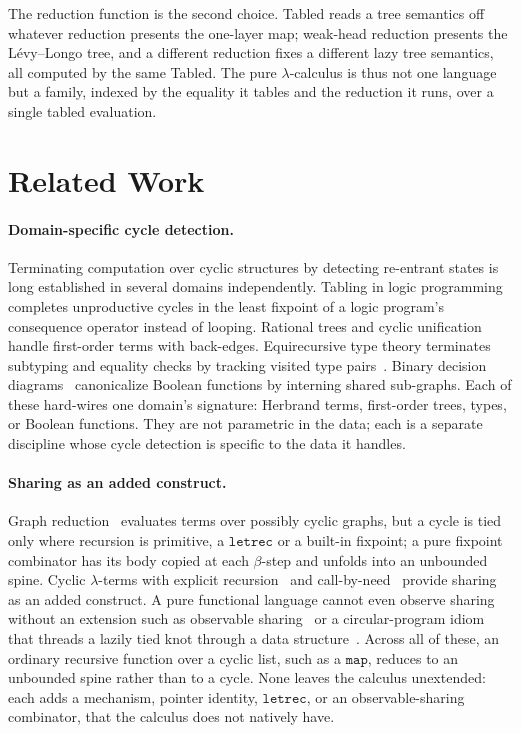 The reduction function is the second choice. \textsf{Tabled} reads a tree semantics off whatever reduction presents the one-layer map; weak-head reduction presents the L\'evy--Longo tree, and a different reduction fixes a different lazy tree semantics, all computed by the same \textsf{Tabled}. The pure $\lambda$-calculus is thus not one language but a family, indexed by the equality it tables and the reduction it runs, over a single tabled evaluation.

\section{Related Work}\label{sec:related}

\paragraph{Domain-specific cycle detection.}
Terminating computation over cyclic structures by detecting re-entrant states is long established in several domains independently. Tabling in logic programming~\cite{tamaki-sato,tabling-slg,vanemden-kowalski} completes unproductive cycles in the least fixpoint of a logic program's consequence operator instead of looping. Rational trees and cyclic unification~\cite{colmerauer1984-trees,courcelle1983-infinite-trees} handle first-order terms with back-edges. Equirecursive type theory terminates subtyping and equality checks by tracking visited type pairs~\cite{amadio1993-subtyping-recursive-types,brandt1998-coinductive-type-equality}. Binary decision diagrams~\cite{bryant1986-bdd} canonicalize Boolean functions by interning shared sub-graphs. Each of these hard-wires one domain's signature: Herbrand terms, first-order trees, types, or Boolean functions. They are not parametric in the data; each is a separate discipline whose cycle detection is specific to the data it handles.

\paragraph{Sharing as an added construct.}
Graph reduction~\cite{wadsworth-graph} evaluates terms over possibly cyclic graphs, but a cycle is tied only where recursion is primitive, a $\mathtt{letrec}$ or a built-in fixpoint; a pure fixpoint combinator has its body copied at each $\beta$-step and unfolds into an unbounded spine. Cyclic $\lambda$-terms with explicit recursion~\cite{ariola1997-explicit-recursion} and call-by-need~\cite{ariola-felleisen} provide sharing as an added construct. A pure functional language cannot even observe sharing without an extension such as observable sharing~\cite{gill} or a circular-program idiom that threads a lazily tied knot through a data structure~\cite{bird}. Across all of these, an ordinary recursive function over a cyclic list, such as a $\mathtt{map}$, reduces to an unbounded spine rather than to a cycle. None leaves the calculus unextended: each adds a mechanism, pointer identity, $\mathtt{letrec}$, or an observable-sharing combinator, that the calculus does not natively have.

